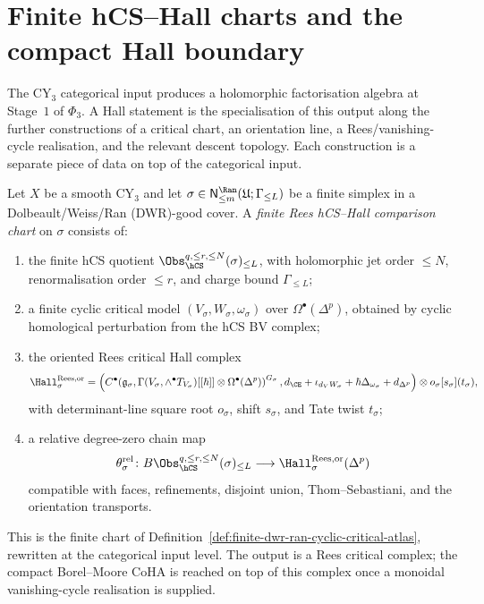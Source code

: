\section{Finite hCS--Hall charts and the compact Hall boundary}
\label{sec:cycat-finite-hcs-hall-boundary}

The CY$_3$ categorical input produces a holomorphic factorisation
algebra at Stage~$1$ of $\Phi_3$. A Hall statement is the
specialisation of this output along the further constructions of a
critical chart, an orientation line, a Rees/vanishing-cycle
realisation, and the relevant descent topology. Each construction is
a separate piece of data on top of the categorical input.

\begin{definition}
\label{def:cycat-finite-rees-hcs-hall-chart}
Let $X$ be a smooth CY$_3$ and let
\(\sigma\in\mathsf N^{\Ran}_{\leq m}(\mathfrak U;\Gamma_{\leq L})\)
be a finite simplex in a Dolbeault/Weiss/Ran (DWR)-good cover. A
\emph{finite Rees hCS--Hall comparison chart} on $\sigma$ consists of:
\begin{enumerate}[label=\textup{(\roman*)}]
 \item the finite hCS quotient
 \(\Obs_{\hCS}^{q,\leq r,\leq N}(\sigma)_{\leq L}\), with holomorphic
 jet order $\leq N$, renormalisation order $\leq r$, and charge bound
 $\Gamma_{\leq L}$;
 \item a finite cyclic critical model
 \((V_\sigma,W_\sigma,\omega_\sigma)\) over
 \(\Omega^\bullet(\Delta^p)\), obtained by cyclic homological
 perturbation from the hCS BV complex;
 \item the oriented Rees critical Hall complex
 \[
  \Hall_{\sigma}^{\mathrm{Rees},\mathrm{or}}
  =
  \left(
  C^\bullet\!\left(
  \mathfrak g_\sigma,
  \Gamma(V_\sigma,\wedge^\bullet T_{V_\sigma})[[\hbar]]
  \otimes\Omega^\bullet(\Delta^p)
  \right)^{G_\sigma},
  d_{\CE}+\iota_{d_VW_\sigma}
  +\hbar\Delta_{\omega_\sigma}+d_{\Delta^p}
  \right)
  \otimes o_\sigma[s_\sigma](t_\sigma),
 \]
 with determinant-line square root \(o_\sigma\), shift \(s_\sigma\),
 and Tate twist \(t_\sigma\);
 \item a relative degree-zero chain map
 \[
  \theta_\sigma^{\mathrm{rel}}\colon
  B\Obs_{\hCS}^{q,\leq r,\leq N}(\sigma)_{\leq L}
  \longrightarrow
  \Hall_{\sigma}^{\mathrm{Rees},\mathrm{or}}(\Delta^p)
 \]
 compatible with faces, refinements, disjoint union, Thom--Sebastiani,
 and the orientation transports.
\end{enumerate}
This is the finite chart of
Definition~\ref{def:finite-dwr-ran-cyclic-critical-atlas}, rewritten
at the categorical input level. The output is a Rees critical
complex; the compact Borel--Moore CoHA is reached on top of this
complex once a monoidal vanishing-cycle realisation is supplied.
\end{definition}

